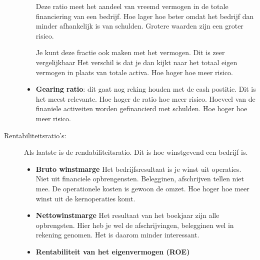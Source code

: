 \documentclass[a4paper,11pt]{article}
\begin{document}
\begin{description}
\begin{itemize}
        {Deze ratio meet het aandeel van vreemd vermogen 
        in de totale financiering van een bedrijf. Hoe lager hoe beter
         omdat het bedrijf dan minder afhankelijk is van schulden.
        Grotere waarden zijn een groter risico.
        }

        Je kunt deze fractie ook maken met het vermogen. Dit is zeer vergelijkbaar
         Het verschil is dat je dan kijkt naar het totaal eigen vermogen in plaats van totale activa.
        Hoe hoger hoe meer risico.

        {}

        \item \textbf{Gearing ratio}: 
        dit gaat nog reking houden met de cash postitie.
        Dit is het meest relevante. Hoe hoger de ratio
        hoe meer risico.
        {Hoeveel van de finaniele activeiten worden gefinancierd met schulden.
        Hoe hoger hoe meer risico.}
        
    \end{itemize}
    

    \item[Rentabiliteitsratio's:]
    Als laatste is de rendabiliteitsratio.
    Dit is hoe winstgevend een bedrijf is.

    \begin{itemize}
        \item \textbf{Bruto winstmarge}
        {Het bedrijfsresultaat is je winst uit operaties. Niet uit financiele 
        opbrengensten. Belegginen, afschrijven tellen niet mee. De operationele kosten is gewoon de omzet.
        Hoe hoger hoe meer winst uit de kernoperaties komt.}

        \item \textbf{Nettowinstmarge}
        {Het resultaat van het boekjaar zijn alle opbrengsten. Hier heb je wel de afschrijvingen, belegginen wel in rekening genomen. Het is 
        daarom minder interessant.}

        \item \textbf{Rentabiliteit van het eigenvermogen (ROE)}
        

\end{itemize}
\end{description}
\end{document}
